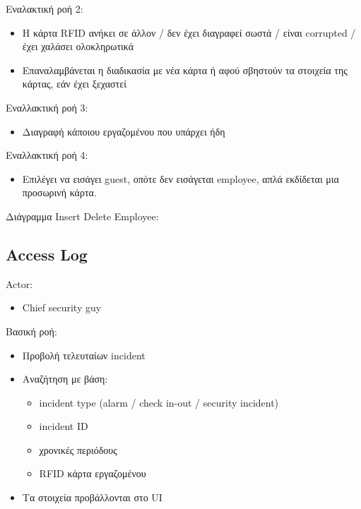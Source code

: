 \documentclass{article}
\begin{document}
\noindent Εναλακτική ροή 2:
\begin{itemize}
    \item Η κάρτα RFID ανήκει σε άλλον / δεν έχει διαγραφεί σωστά / είναι corrupted / έχει χαλάσει ολοκληρωτικά
    \item Επαναλαμβάνεται η διαδικασία με νέα κάρτα ή αφού σβηστούν τα στοιχεία της κάρτας, εάν έχει ξεχαστεί
\end{itemize}

\noindent Εναλλακτική ροή 3:
\begin{itemize}
    \item Διαγραφή κάποιου εργαζομένου που υπάρχει ήδη
\end{itemize}

\noindent Εναλλακτική ροή 4:
\begin{itemize}
    \item Επιλέγει να εισάγει guest, οπότε δεν εισάγεται employee, απλά εκδίδεται μια προσωρινή κάρτα. 
\end{itemize}

\newpage
\noindent Διάγραμμα Insert Delete Employee: \\
\noindent{}
\newpage

\subsection{Access Log}

\noindent Actor:
\begin{itemize}
    \item Chief security guy
\end{itemize}

\noindent Βασική ροή:
\begin{itemize}
    \item Προβολή τελευταίων incident
    \item Αναζήτηση με βάση:
    \begin{itemize}
        \item incident type (alarm / check in-out / security incident)
        \item incident ID
        \item χρονικές περιόδους
        \item RFID κάρτα εργαζομένου
    \end{itemize}
    \item Τα στοιχεία προβάλλονται στο UI
\end{itemize}
\end{document}

